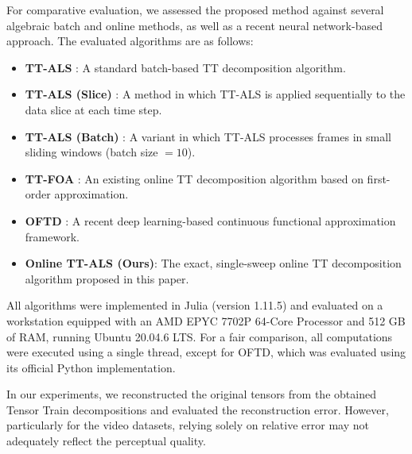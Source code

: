 \documentclass[a4paper, 11pt]{article}
\theoremstyle{plain}
\theoremstyle{definition}
\theoremstyle{remark}
\begin{document}
For comparative evaluation, we assessed the proposed method against several algebraic batch and online methods, as well as a recent neural network-based approach. The evaluated algorithms are as follows:
\begin{itemize}
    \item \textbf{TT-ALS} \citep{TT-ALS}: A standard batch-based TT decomposition algorithm.
    \item \textbf{TT-ALS (Slice)} \citep{TT-ALS}: A method in which TT-ALS is applied sequentially to the data slice at each time step.
    \item \textbf{TT-ALS (Batch)} \citep{TT-ALS}: A variant in which TT-ALS processes frames in small sliding windows (batch size $= 10$).
    \item \textbf{TT-FOA} \citep{TT-FOA}: An existing online TT decomposition algorithm based on first-order approximation.
    \item \textbf{OFTD} \citep{OFTD}: A recent deep learning-based continuous functional approximation framework.
    \item \textbf{Online TT-ALS (Ours)}: The exact, single-sweep online TT decomposition algorithm proposed in this paper.
\end{itemize}
All algorithms were implemented in Julia (version 1.11.5) and evaluated on a workstation equipped with an AMD EPYC 7702P 64-Core Processor and 512 GB of RAM, running Ubuntu 20.04.6 LTS.
For a fair comparison, all computations were executed using a single thread, except for OFTD, which was evaluated using its official Python implementation.

In our experiments, we reconstructed the original tensors from the obtained Tensor Train decompositions and evaluated the reconstruction error.
However, particularly for the video datasets, relying solely on relative error may not adequately reflect the perceptual quality.
\end{document}

